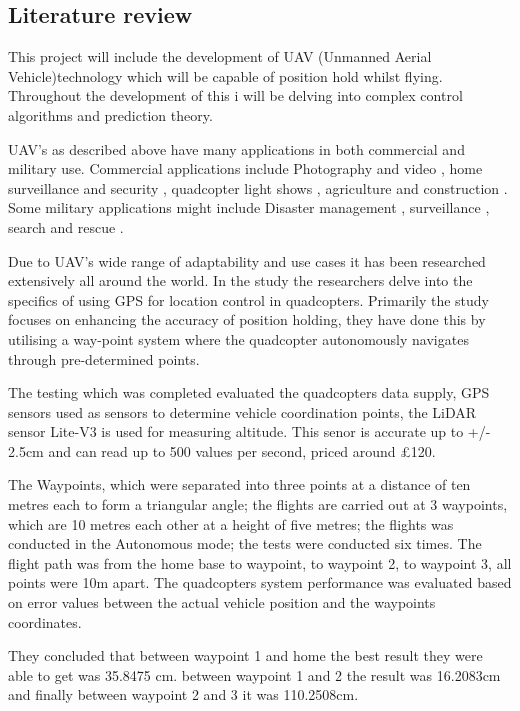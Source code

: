 \documentclass{article}
\begin{document}
\subsection{Literature review}
This project will include the development of UAV (Unmanned Aerial
Vehicle)technology which will be capable of position hold whilst flying.
Throughout the development of this i will be delving into complex control
algorithms and prediction theory. 

UAV's as described above have many applications in both commercial and military
use. Commercial applications include Photography and video
\cite{photographyAndVideo}, home surveillance and security \cite{security},
quadcopter light shows \cite{lightShow}, agriculture \cite{agricultural} and
construction \cite{construction}. Some military applications might include
Disaster management \cite{disasterManagement}, surveillance \cite{surveillance},
search and rescue \cite{searchAndRescue}.

Due to UAV's wide range of adaptability and use cases it has been researched
extensively all around the world. In the study \cite{Widhianto2023Quadcopter}
the researchers delve into the specifics of using GPS for location control in
quadcopters. Primarily the study focuses on enhancing the accuracy of position
holding, they have done this by utilising a way-point system where the
quadcopter autonomously navigates through pre-determined points.

The testing which was completed evaluated the quadcopters data supply, GPS
sensors used as sensors to determine vehicle coordination points, the LiDAR
sensor Lite-V3 is used for measuring altitude. This senor is accurate up to +/-
2.5cm and can read up to 500 values per second, priced around £120.

The Waypoints, which were separated into three points at a distance of ten
metres each to form a triangular angle; the flights are carried out at 3
waypoints, which are 10 metres each other at a height of five metres; the
flights was conducted in the Autonomous mode; the tests were conducted six
times. The flight path was from the home base to waypoint, to waypoint 2, to
waypoint 3, all points were 10m apart. The quadcopters system performance was
evaluated based on error values between the actual vehicle position and the
waypoints coordinates.

They concluded that between waypoint 1 and home the best result they were able
to get was 35.8475 cm. between waypoint 1 and 2 the result was 16.2083cm and
finally between waypoint 2 and 3 it was 110.2508cm.
\end{document}

